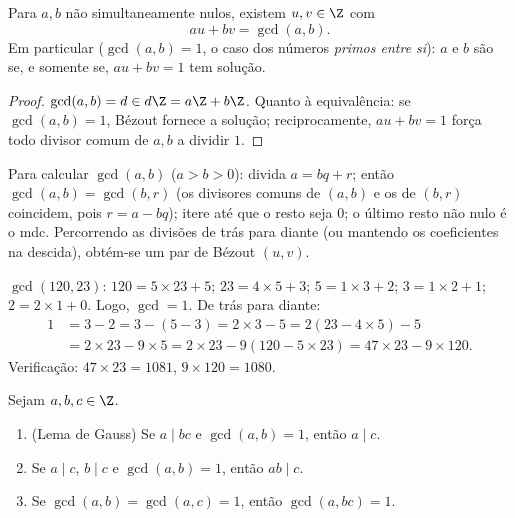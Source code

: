 \begin{corollary}\label{cor:b1:arith:bezout}
Para $a, b$ não simultaneamente nulos, existem $u, v \in \Z$ com
\[
au + bv = \gcd(a, b) .
\]
Em particular ($\gcd(a,b) = 1$, o caso dos números \emph{primos entre
si}): $a$ e $b$ são  se, e somente
se, $au + bv = 1$ tem solução.
\end{corollary}

\begin{proof}
$\gcd(a,b) = d \in d\Z = a\Z + b\Z$. Quanto à equivalência: se
$\gcd(a,b) = 1$, Bézout fornece a solução; reciprocamente, $au + bv =
1$ força todo divisor comum de $a, b$ a dividir $1$.
\end{proof}

\begin{method}\label{met:b1:arith:euclid}
Para calcular $\gcd(a, b)$ ($a > b > 0$): divida $a = bq + r$; então
$\gcd(a, b) = \gcd(b, r)$ (os divisores comuns de $(a,b)$ e os de $(b,r)$
coincidem, pois $r = a - bq$); itere até que o resto seja $0$; o
último resto não nulo é o mdc. Percorrendo
as divisões de trás para diante (ou mantendo os coeficientes na
descida), obtém-se um par de Bézout $(u, v)$.
\end{method}

\begin{example}\label{ex:b1:arith:euclid}
$\gcd(120, 23)$: $120 = 5 \times 23 + 5$; $23 = 4 \times 5 + 3$; $5 =
1\times 3 + 2$; $3 = 1 \times 2 + 1$; $2 = 2 \times 1 + 0$. Logo,
$\gcd = 1$. De trás para diante:
\begin{align*}
1 &= 3 - 2 = 3 - (5 - 3) = 2\times 3 - 5 = 2(23 - 4\times 5) - 5 \\
&= 2 \times 23 - 9 \times 5 = 2\times 23 - 9(120 - 5\times 23)
= 47 \times 23 - 9 \times 120 .
\end{align*}
Verificação: $47 \times 23 = 1081$, $9 \times 120 = 1080$.
\end{example}

\begin{theorem}\label{thm:b1:arith:gauss}
Sejam $a, b, c \in \Z$.
\begin{enumerate}
  \item (Lema de Gauss) Se $a \mid bc$ e
        $\gcd(a, b) = 1$, então $a \mid c$.
  \item Se $a \mid c$, $b \mid c$ e $\gcd(a,b) = 1$, então $ab \mid
        c$.
  \item Se $\gcd(a, b) = \gcd(a, c) = 1$, então $\gcd(a, bc) = 1$.
\end{enumerate}
\end{theorem}

